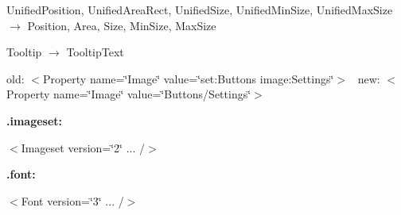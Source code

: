 \begin{DoxyItemize}
\begin{DoxyItemize}
\item Unified\+Position, Unified\+Area\+Rect, Unified\+Size, Unified\+Min\+Size, Unified\+Max\+Size {$\rightarrow$} Position, Area, Size, Min\+Size, Max\+Size
\item Tooltip {$\rightarrow$} Tooltip\+Text
\item old\+: $<$\+Property name=\char`\"{}\+Image\char`\"{} value=\char`\"{}set\+:\+Buttons image\+:\+Settings\char`\"{}$>$~\newline
new\+: $<$\+Property name=\char`\"{}\+Image\char`\"{} value=\char`\"{}\+Buttons/\+Settings\char`\"{}$>$
\end{DoxyItemize}
\item {\bfseries{.imageset\+:}}
\begin{DoxyItemize}
\item $<$Imageset version=\char`\"{}2\char`\"{} ... /$>$
\end{DoxyItemize}
\item {\bfseries{.font\+:}}
\begin{DoxyItemize}
\item $<$Font version=\char`\"{}3\char`\"{} ... /$>$ 
\end{DoxyItemize}
\end{DoxyItemize}